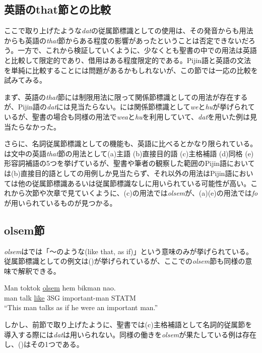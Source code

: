 \subsection{英語のthat節との比較}\label{sec:vsthat}

ここで取り上げたような\textit{dat}の従属節標識としての使用は、その発音からも用法からも英語の\textit{that}節からある程度の影響があったということは否定できないだろう。一方で、これから検証していくように、少なくとも聖書の中での用法は英語と比較して限定的であり、借用はある程度限定的である。Pijin語と英語の文法を単純に比較することには問題があるかもしれないが、この節では一応の比較を試みてみる。

まず、英語の\textit{that}節には制限用法に限って関係節標識としての用法が存在する\cite[365--367]{english}が、Pijin語の\textit{dat}には見当たらない。\cite{dictionary}には関係節標識として\textit{we}と\textit{hu}が挙げられているが、聖書の場合も同様の用法で\textit{wea}と\textit{hu}を利用していて、\textit{dat}を用いた例は見当たらなかった。

さらに、名詞従属節標識としての機能も、英語に比べるとかなり限られている。\cite{english}は文中の英語\textit{that}節の用法として(a)主語 (b)直接目的語  (c)主格補語 (d)同格 (e)形容詞補語の5つを挙げているが、聖書や筆者の観察した範囲のPijin語においては(b)直接目的語としての用例しか見当たらず、それ以外の用法はPijin語においては他の従属節標識あるいは従属節標識なしに用いられている可能性が高い。これから次節や次章で見ていくように、(c)の用法では\textit{olsem}が、(a)(e)の用法では\textit{fo}が用いられているものが見つかる。

\subsection{olsem節}
\textit{olsem}は\cite{dictionary}では「～のような(like that, as if)」という意味のみが挙げられている。従属節標識としての例文は()が挙げられているが、ここでの\textit{olsem}節も同様の意味で解釈できる。
%
\begin{exe}
  \ex\label{ex:naostatm}
  \gll Man toktok \underline{olsem} hem bikman nao.\\
  man talk \underline{like} 3SG important-man STATM\\
  \glt ``This man talks as if he were an important man.'' \citep[157]{dictionary}
\end{exe}

しかし、前節で取り上げたように、聖書では(c)主格補語として名詞的従属節を導入する際には\textit{dat}は用いられない。同様の働きを\textit{olsem}が果たしている例は存在し、()はその1つである。

